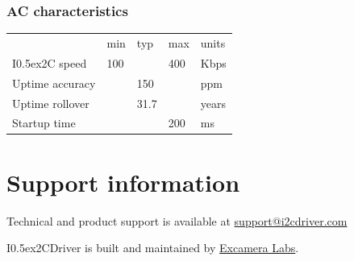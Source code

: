 \documentclass{article}
\newcommand{\two}{\raise0.5ex\hbox{\footnotesize{2}}}
\newcommand{\iic}{I\two{}C}
\newcommand{\iicdriver}{I\two{}CDriver}
\newcommand{\heavyline}{\specialrule{1pt}{1pt}{1pt}}
\begin{document}
\subsubsection*{AC characteristics}
\vspace{10 pt}

{\renewcommand{\arraystretch}{1.2}%
\begin{tabularx}{\linewidth}{XC{40pt}C{40pt}C{40pt}C{40pt}}
\heavyline
& min & typ & max & units \\ \heavyline

\iic{} speed                     &100& &400& Kbps   \\ \hline {}
Uptime accuracy               && 150 && ppm           \\ \hline
Uptime rollover               && 31.7 && years        \\ \hline
Startup time & & & 200 & ms \\ \hline
\end{tabularx}}
\vspace{10 pt}

\section{Support information}

Technical and product support is available at
\href{mailto:support@i2cdriver.com}{support@i2cdriver.com}

\iicdriver{} is built and maintained by
\href{https://excamera.com}{Excamera Labs}.

\newpage
\raggedright
{}
\renewcommand{\indexname}{Index}
\printindex
\end{document}
